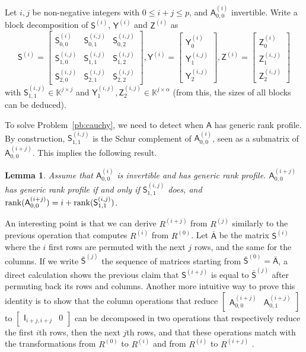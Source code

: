 \documentclass{sig-alternate}
\newcommand{\mA}{\ensuremath{\mathsf{A}}}
\newcommand{\mI}{\ensuremath{\mathsf{I}}}
\newcommand{\mS}{\ensuremath{\mathsf{S}}}
\newcommand{\mY}{\ensuremath{\mathsf{Y}}}
\newcommand{\mZ}{\ensuremath{\mathsf{Z}}}
\newcommand{\K}{\ensuremath{\mathbb{K}}}
\newtheorem{lemma}[definition]{Lemma}
\begin{document}
Let $i,j$ be non-negative integers with $0 \le i+j \le p$, and
${\mA^{(i)}_{0,0}}$ invertible. Write a block decomposition of $\mS^{(i)}$, $\mY^{(i)}$ and
$\mZ^{(i)}$ as
\begin{equation*}
\mS^{(i)} = \begin{bmatrix} 
\mS^{(i)}_{0,0} & \mS^{(i,j)}_{0,1} & \mS^{(i,j)}_{0,2}\\
\mS^{(i,j)}_{1,0} & \mS^{(i,j)}_{1,1} & \mS^{(i,j)}_{1,2}\\
\mS^{(i,j)}_{2,0} & \mS^{(i,j)}_{2,1} & \mS^{(i,j)}_{2,2}
    \end{bmatrix},  
\mY^{(i)} = 
\begin{bmatrix}
  \mY^{(i)}_0 \\\mY^{(i,j)}_1 \\\mY^{(i,j)}_2
\end{bmatrix},
\mZ^{(i)} = 
\begin{bmatrix}
  \mZ^{(i)}_0 \\\mZ^{(i,j)}_1 \\\mZ^{(i,j)}_2
\end{bmatrix}
\end{equation*}
with $\mS^{(i,j)}_{1,1} \in \K^{j \times j}$ and
$\mY^{(i,j)}_1, \mZ^{(i,j)}_2 \in \K^{j \times \alpha}$ (from this,
the sizes of all blocks can be deduced).

To solve Problem~\ref{pb:cauchy}, we need to detect when $\mA$ has
generic rank profile. By construction, $\mS^{(i,j)}_{1,1}$ is the
Schur complement of ${\mA^{(i)}_{0,0}}$, seen as a submatrix of
$\mA^{(i+j)}_{0,0}$. This implies the following result.

\begin{lemma}\label{lemma:update}
  Assume that $\mA^{(i)}_{0,0}$ is invertible and has generic rank
  profile.
  $\mA^{(i+j)}_{0,0}$ has generic rank profile if and only if
  $\mS^{(i,j)}_{1,1}$ does, and
  ${\rm rank}(\mA^{(i+j)}_{0,0})=i+{\rm rank}(\mS^{(i,j)}_{1,1})$. 
\end{lemma}

An interesting point is that we can derive $R^{(i+j)}$ from $R^{(j)}$ similarly
to the previous operation that computes $R^{(i)}$ from $R^{(0)}$. Let
$\bar{\mA}$ be the matrix $\mS^{(i)}$ where the $i$ first rows are permuted with
the next $j$ rows, and the same for the columns. If we write $\bar{\mS}^{(j)}$
the sequence of matrices starting from $\bar{\mS}^{(0)}=\bar{\mA}$, a direct
calculation shows the previous claim that $\mS^{(i+j)}$ is equal to
$\bar{\mS}^{(j)}$ after permuting back its rows and columns. Another more
intuitive way to prove this identity is to show that the column operations that
reduce $\begin{bmatrix} \mA^{(i+j)}_{0,0} & \mA^{(i+j)}_{0,1} \end{bmatrix}$ to
$\begin{bmatrix} \mI_{i+j,i+j} & 0 \end{bmatrix}$ can be decomposed in two
operations that respectively reduce the first $i$th rows, then the next $j$th
rows, and that these operations match with the transformations from
$R^{(0)}$ to $R^{(i)}$  and from $R^{(i)}$ to $R^{(i+j)}$ .
\end{document}
